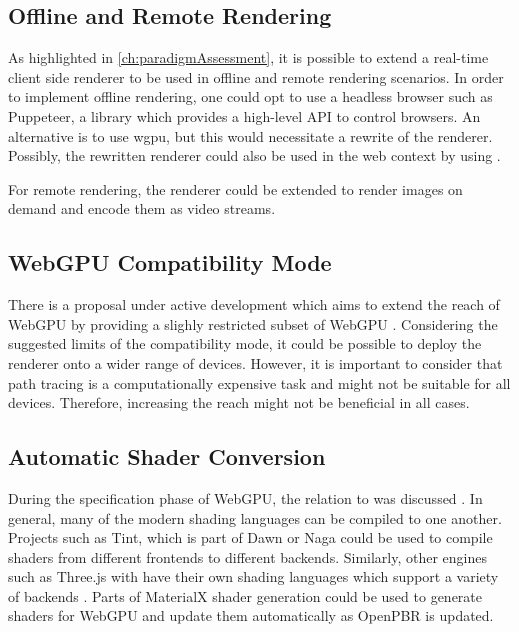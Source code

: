 \subsection*{Offline and Remote Rendering}

As highlighted in \autoref{ch:paradigmAssessment}, it is possible to extend a real-time client side renderer to be used in offline and remote rendering scenarios. In order to implement offline rendering, one could opt to use a headless browser such as Puppeteer, a  library which provides a high-level \gls{API} to control browsers. An alternative is to use \gls{wgpu}, but this would necessitate a rewrite of the renderer. Possibly, the rewritten renderer could also be used in the web context by using .

For remote rendering, the renderer could be extended to render images on demand and encode them as video streams.

\subsection*{WebGPU Compatibility Mode}

There is a proposal under active development which aims to extend the reach of WebGPU by providing a slighly restricted subset of WebGPU \cite{WebGPUCompatibilityModeProposal}. Considering the suggested limits of the compatibility mode, it could be possible to deploy the renderer onto a wider range of devices. However, it is important to consider that path tracing is a computationally expensive task and might not be suitable for all devices. Therefore, increasing the reach might not be beneficial in all cases.

\subsection*{Automatic Shader Conversion}

During the specification phase of WebGPU, the relation to  was discussed \cite{webGPUSpirVRelation}. In general, many of the modern shading languages can be compiled to one another. Projects such as Tint, which is part of \gls{Dawn} \cite{dawnImplementation} or Naga \cite{nagaImplementation} could be used to compile shaders from different frontends to different backends. Similarly, other engines such as \gls{Three.js} with  have their own shading languages which support a variety of backends \cite{ThreeJSShadingLanguage}. Parts of \gls{MaterialX} shader generation could be used to generate shaders for WebGPU and update them automatically as \gls{OpenPBR} is updated.

